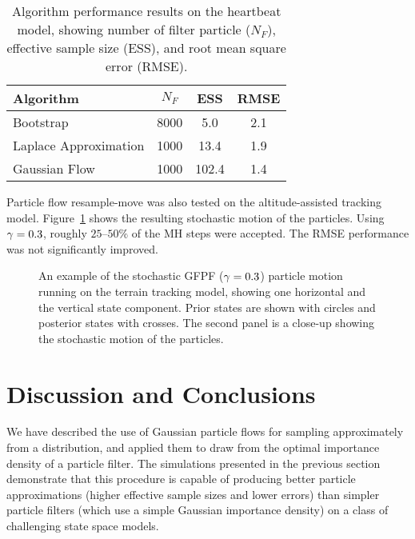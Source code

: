 \documentclass{article}
\begin{document}
\begin{table}
\centering
\begin{tabular}{l||c|c|c}
Algorithm                                & $N_F$ & ESS  & RMSE \\
\hline
Bootstrap                                & 8000 & 5.0   &  2.1 \\
Laplace Approximation                    & 1000 & 13.4  &  1.9 \\
Gaussian Flow                            & 1000 & 102.4 &  1.4 \\
\end{tabular}
\caption{Algorithm performance results on the heartbeat model, showing number of filter particle ($N_F$), effective sample size (ESS), and root mean square error (RMSE).}
\label{tab:sineha_results}
\end{table}

Particle flow resample-move was also tested on the altitude-assisted tracking model. Figure~\ref{fig:drone_example_frame_stochastic} shows the resulting stochastic motion of the particles. Using $\gamma=0.3$, roughly $25$--$50\%$ of the MH steps were accepted. The RMSE performance was not significantly improved.
%
\begin{figure}
\centering
\subfloat[]{}
\subfloat[]{}
\caption{An example of the stochastic GFPF ($\gamma=0.3$) particle motion running on the terrain tracking model, showing one horizontal and the vertical state component. Prior states are shown with circles and posterior states with crosses. The second panel is a close-up showing the stochastic motion of the particles.}
\label{fig:drone_example_frame_stochastic}
\end{figure}


\section{Discussion and Conclusions}

We have described the use of Gaussian particle flows for sampling approximately from a distribution, and applied them to draw from the optimal importance density of a particle filter. The simulations presented in the previous section demonstrate that this procedure is capable of producing better particle approximations (higher effective sample sizes and lower errors) than simpler particle filters (which use a simple Gaussian importance density) on a class of challenging state space models.
\end{document}
